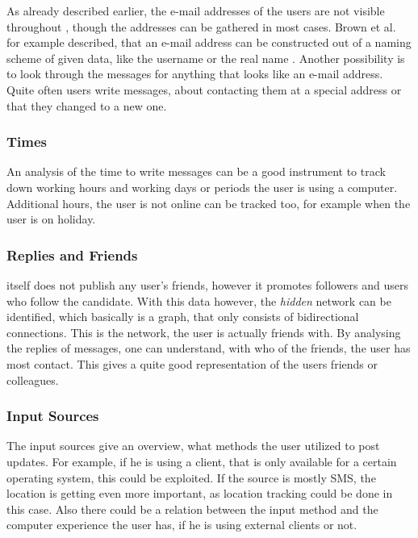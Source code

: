 As already described earlier, the e-mail addresses of the users are not visible
throughout \Twitter{}, though the addresses can be gathered in most cases.
Brown et al. for example described, that an e-mail address can be constructed out
of a naming scheme of given data, like the username or the real name
\cite{brown2008}. Another possibility is to look through the messages for
anything that looks like an e-mail address. Quite often users write messages,
about contacting them at a special address or that they changed to a new one.

\subsubsection{Times}

An analysis of the time to write messages can be a good instrument to track
down working hours and working days or periods the user is using a computer.
Additional hours, the user is not online can be tracked too, for example
when the user is on holiday.

\subsubsection{Replies and Friends}

\Twitter{} itself does not publish any user's friends, however it promotes
followers and users who follow the candidate. With this data however, the
\textit{hidden} network can be identified, which basically is a graph, that
only consists of bidirectional connections. This is the network, the user is
actually friends with. By analysing the replies of messages, one can
understand, with who of the friends, the user has most contact. This
gives a quite good representation of the users friends or colleagues.

\subsubsection{Input Sources}

The \Twitter{} input sources give an overview, what methods the user utilized to
post updates. For example, if he is using a \Twitter{} client, that is only
available for a certain operating system, this could be exploited. If the
source is mostly SMS, the location is getting even more important, as location
tracking could be done in this case. Also there could be a relation between the
input method and the computer experience the user has, if he is using external
clients or not.

